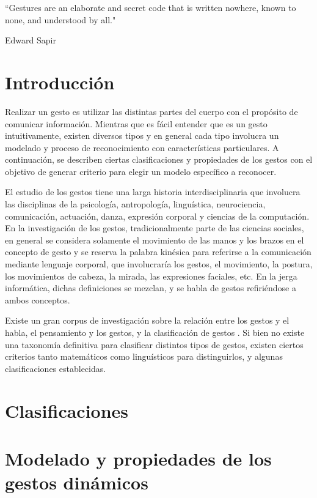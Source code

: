

\epigraph{``Gestures are an elaborate and secret code that is written nowhere, known to none, and understood by all."}{Edward Sapir}


\section{Introducción}

Realizar un gesto es utilizar las distintas partes del cuerpo con el propósito de comunicar información. Mientras que es fácil entender que es un gesto intuitivamente, existen diversos tipos y en general cada tipo involucra un modelado y proceso de reconocimiento con características particulares. A continuación, se describen ciertas clasificaciones y propiedades de los gestos con el objetivo de generar criterio para elegir un modelo específico a reconocer.

El estudio de los gestos tiene una larga historia interdisciplinaria que involucra las disciplinas de la psicología, antropología, linguística, neurociencia, comunicación, actuación, danza, expresión corporal y ciencias de la computación. En la investigación de los gestos, tradicionalmente parte de las ciencias sociales, en general se considera solamente el movimiento de las manos y los brazos en el concepto de gesto y se reserva la palabra kinésica para referirse a la comunicación mediante lenguaje corporal, que involucraría los gestos, el movimiento, la postura, los movimientos de cabeza, la mirada, las expresiones faciales, etc. En la jerga informática, dichas definiciones se mezclan, y se habla de gestos refiriéndose a ambos conceptos.

Existe un gran corpus de investigación sobre la relación entre los gestos y el habla, el pensamiento y los gestos, y la clasificación de gestos \cite{capone2004gesture,hostetter2008visible,goldin2010action,iverson1999hand,mcneill92}. Si bien no existe una taxonomía definitiva para clasificar distintos tipos de gestos, existen ciertos criterios tanto matemáticos como linguísticos para distinguirlos, y algunas clasificaciones establecidas.

\section{Clasificaciones}


\section{Modelado y propiedades de los gestos dinámicos}

